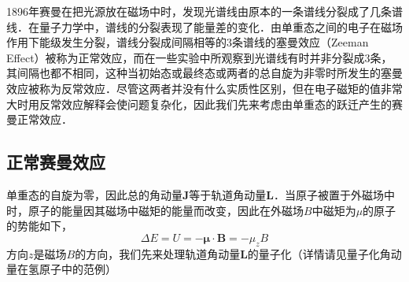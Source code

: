 
\begin{issues}
\issueTODO
\end{issues}


1896年赛曼在把光源放在磁场中时，发现光谱线由原本的一条谱线分裂成了几条谱线．在量子力学中，谱线的分裂表现了能量差的变化．由单重态之间的电子在磁场作用下能级发生分裂，谱线分裂成间隔相等的3条谱线的塞曼效应（Zeeman Effect）被称为正常效应，而在一些实验中所观察到光谱线有时并非分裂成3条，其间隔也都不相同，这种当初始态或最终态或两者的总自旋为非零时所发生的塞曼效应被称为反常效应．尽管这两者并没有什么实质性区别，但在电子磁矩的值非常大时用反常效应解释会使问题复杂化，因此我们先来考虑由单重态的跃迁产生的赛曼正常效应．

\subsection{正常赛曼效应}
单重态的自旋为零，因此总的角动量$\mathbf{J}$等于轨道角动量$\mathbf{L}$．当原子被置于外磁场中时，原子的能量因其磁场中磁矩的能量而改变，因此在外磁场$B$中磁矩为$\mu$的原子的势能如下，
\begin{equation}
\Delta E=U = -\boldsymbol\mu\cdot \mathbf{B}=-\mu_z B
\end{equation}
方向$z$是磁场$B$的方向，我们先来处理轨道角动量$\mathbf{L}$的量子化（详情请见量子化角动量在氢原子中的范例）

